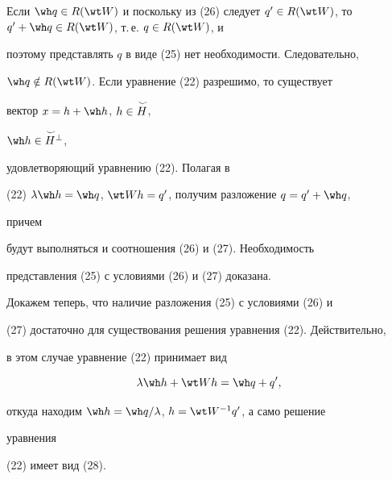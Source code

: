 \begin{pf} 


Если $\wh q\in R(\wt W)$ и поскольку из (26) следует $q'\in 


R(\wt W)$, то $q'+\wh q\in R(\wt W)$, т.\,е. $q\in R(\wt W)$, и 


поэтому представлять $q$ в виде (25) нет необходимости. Следовательно,


$\wh q\notin R(\wt W)$. Если уравнение (22) разрешимо, то существует 


вектор $x=h+\wh h$, $h\in\overset{\,\smile}{H}{}$, 


$\wh h\in\up{\smile}{H}^\bot$, 


удовлетворяющий уравнению (22). Полагая в 


(22) $\lambda\wh h=\wh q$, $\wt Wh=q'$, получим разложение $q=q'+\wh q$, 


причем 


будут выполняться и соотношения (26) и (27). Необходимость 


представления (25) с условиями (26) и (27) доказана. 


 


Докажем теперь, что наличие разложения (25) с условиями (26) и 


(27) достаточно для существования решения уравнения (22). Действительно, 


в этом случае уравнение (22) принимает вид 


$$ 


\lambda\wh h+\wt Wh=\wh q+q', 


$$ 


откуда находим $\wh h=\wh q/\lambda$, $h=\wt W^{-1}q'$, а само решение 


уравнения 


(22) имеет вид (28). 


\end{pf} 


 



